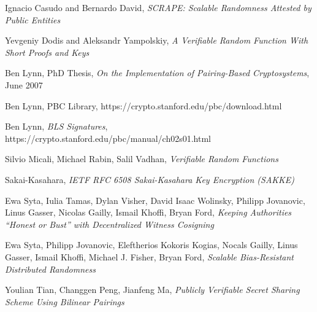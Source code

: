 \documentclass{yellowpaper}
\begin{document}
\begin{thebibliography}{99}

Ignacio Casudo and Bernardo David, 
{\em{ SCRAPE: Scalable Randomness Attested by Public Entities}} 

Yevgeniy Dodis and Aleksandr Yampolskiy, 
{\em{A Verifiable Random Function With Short Proofs and Keys}}

 Ben Lynn, PhD Thesis, 
{\em{On the Implementation of Pairing-Based Cryptosystems}}, June 2007

 Ben Lynn, PBC Library, 
https://crypto.stanford.edu/pbc/download.html

 Ben Lynn, 
{\em{BLS Signatures}}, 
https://crypto.stanford.edu/pbc/manual/ch02s01.html

Silvio Micali, Michael Rabin, Salil Vadhan, 
{\em{Verifiable Random Functions}}

Sakai-Kasahara, 
{\em{IETF RFC 6508 Sakai-Kasahara Key Encryption (SAKKE)}} 

Ewa Syta, Iulia Tamas, Dylan Visher, David Isaac Wolinsky, Philipp Jovanovic, Linus Gasser, Nicolas Gailly, Ismail Khoffi, Bryan Ford, 
{\em{Keeping Authorities ``Honest or Bust'' with Decentralized Witness Cosigning}}

 Ewa Syta, Philipp Jovanovic, Eleftherios Kokoris Kogias, Nocals Gailly, Linus Gasser, Ismail Khoffi, Michael J. Fisher, Bryan Ford, 
{\em{Scalable Bias-Resistant Distributed Randomness}}

 Youlian Tian, Changgen Peng, Jianfeng Ma, 
{\em{Publicly Verifiable Secret Sharing Scheme Using Bilinear Pairings}}

\end{thebibliography} 
\end{document}
